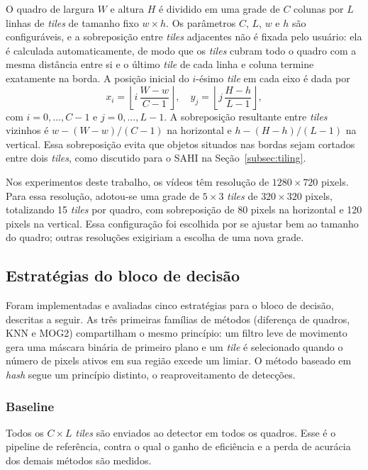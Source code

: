 \documentclass{ieeeaccess}
\begin{document}
O quadro de largura $W$ e altura $H$ é dividido em uma grade de $C$ colunas por $L$ linhas de \textit{tiles} de tamanho fixo $w \times h$. Os parâmetros $C$, $L$, $w$ e $h$ são configuráveis, e a sobreposição entre \textit{tiles} adjacentes não é fixada pelo usuário: ela é calculada automaticamente, de modo que os \textit{tiles} cubram todo o quadro com a mesma distância entre si e o último \textit{tile} de cada linha e coluna termine exatamente na borda. A posição inicial do $i$-ésimo \textit{tile} em cada eixo é dada por
\begin{equation}
x_i = \left\lfloor i \,\frac{W - w}{C - 1} \right\rfloor, \quad y_j = \left\lfloor j \,\frac{H - h}{L - 1} \right\rfloor,
\label{eq:posicao_tiles}
\end{equation}
com $i = 0,\ldots,C-1$ e $j = 0,\ldots,L-1$. A sobreposição resultante entre \textit{tiles} vizinhos é $w - (W - w)/(C - 1)$ na horizontal e $h - (H - h)/(L - 1)$ na vertical. Essa sobreposição evita que objetos situados nas bordas sejam cortados entre dois \textit{tiles}, como discutido para o SAHI na Seção~\ref{subsec:tiling}.

Nos experimentos deste trabalho, os vídeos têm resolução de $1280 \times 720$ pixels. Para essa resolução, adotou-se uma grade de $5 \times 3$ \textit{tiles} de $320 \times 320$ pixels, totalizando 15 \textit{tiles} por quadro, com sobreposição de 80 pixels na horizontal e 120 pixels na vertical. Essa configuração foi escolhida por se ajustar bem ao tamanho do quadro; outras resoluções exigiriam a escolha de uma nova grade.

\subsection{Estratégias do bloco de decisão}
\label{subsec:decisao}

Foram implementadas e avaliadas cinco estratégias para o bloco de decisão, descritas a seguir. As três primeiras famílias de métodos (diferença de quadros, KNN e MOG2) compartilham o mesmo princípio: um filtro leve de movimento gera uma máscara binária de primeiro plano e um \textit{tile} é selecionado quando o número de pixels ativos em sua região excede um limiar. O método baseado em \textit{hash} segue um princípio distinto, o reaproveitamento de detecções.

\subsubsection{Baseline}
Todos os $C \times L$ \textit{tiles} são enviados ao detector em todos os quadros. Esse é o pipeline de referência, contra o qual o ganho de eficiência e a perda de acurácia dos demais métodos são medidos.
\end{document}
